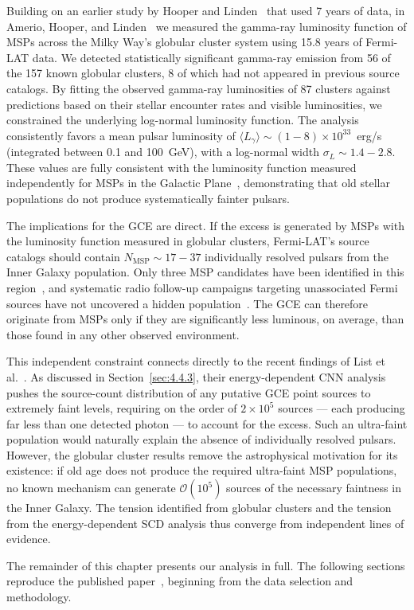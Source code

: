 Building on an earlier study by Hooper and Linden~\cite{Hooper:2016rap} that used 7 years of data, in Amerio, Hooper, and Linden~\cite{Amerio:2024qor} we measured the gamma-ray luminosity function of MSPs across the Milky Way's globular cluster system using 15.8 years of Fermi-LAT data.
We detected statistically significant gamma-ray emission from 56 of the 157 known globular clusters, 8 of which had not appeared in previous source catalogs.
By fitting the observed gamma-ray luminosities of 87 clusters against predictions based on their stellar encounter rates and visible luminosities, we constrained the underlying log-normal luminosity function.
The analysis consistently favors a mean pulsar luminosity of $\langle L_\gamma \rangle \sim (1{-}8) \times 10^{33}$~erg/s (integrated between 0.1 and 100~GeV), with a log-normal width $\sigma_L \sim 1.4{-}2.8$.
These values are fully consistent with the luminosity function measured independently for MSPs in the Galactic Plane~\cite{Holst:2024fvb}, demonstrating that old stellar populations do not produce systematically fainter pulsars.

The implications for the GCE are direct.
If the excess is generated by MSPs with the luminosity function measured in globular clusters, Fermi-LAT's source catalogs should contain $N_\mathrm{MSP} \sim 17{-}37$ individually resolved pulsars from the Inner Galaxy population.
Only three MSP candidates have been identified in this region~\cite{Holst:2024fvb}, and systematic radio follow-up campaigns targeting unassociated Fermi sources have not uncovered a hidden population~\cite{Amerio:2024qor}.
The GCE can therefore originate from MSPs only if they are significantly less luminous, on average, than those found in any other observed environment.

This independent constraint connects directly to the recent findings of List et al.~\cite{List:2025qbx}.
As discussed in Section~\ref{sec:4.4.3}, their energy-dependent CNN analysis pushes the source-count distribution of any putative GCE point sources to extremely faint levels, requiring on the order of $2 \times 10^5$ sources --- each producing far less than one detected photon --- to account for the excess.
Such an ultra-faint population would naturally explain the absence of individually resolved pulsars.
However, the globular cluster results remove the astrophysical motivation for its existence: if old age does not produce the required ultra-faint MSP populations, no known mechanism can generate $\mathcal{O}(10^5)$ sources of the necessary faintness in the Inner Galaxy.
The tension identified from globular clusters and the tension from the energy-dependent SCD analysis thus converge from independent lines of evidence.

The remainder of this chapter presents our analysis in full.
The following sections reproduce the published paper~\cite{Amerio:2024qor}, beginning from the data selection and methodology.
